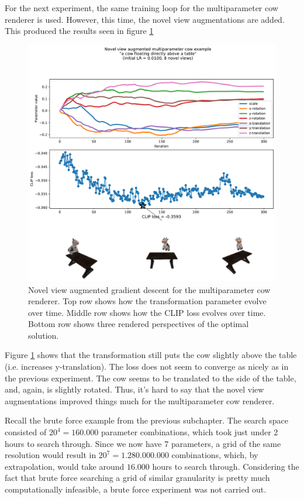 For the next experiment, the same training loop for the multiparameter cow renderer is used. However, this time, the novel view augmentations are added. This produced the results seen in figure \ref{fig:3_3-loss-graph-aug}

\begin{figure}[H]
    \centering
    \includegraphics[width=1.0\textwidth]{figures/3_3-loss-graph-aug.pdf}
    \caption{Novel view augmented gradient descent for the multiparameter cow renderer. Top row shows how the transformation parameter evolve over time. Middle row shows how the CLIP loss evolves over time. Bottom row shows three rendered perspectives of the optimal solution.}
    \label{fig:3_3-loss-graph-aug}
\end{figure}
Figure \ref{fig:3_3-loss-graph-aug} shows that the transformation still puts the cow slightly above the table (i.e. increases y-translation). The loss does not seem to converge as nicely as in the previous experiment. The cow seems to be translated to the side of the table, and, again, is slightly rotated. Thus, it's hard to say that the novel view augmentations improved things much for the multiparameter cow renderer.

Recall the brute force example from the previous subchapter. The search space consisted of $20^4 = 160.000$ parameter combinations, which took just under 2 hours to search through. Since we now have 7 parameters, a grid of the same resolution would result in $20^7 = 1.280.000.000$ combinations, which, by extrapolation, would take around $16.000$ hours to search through. Considering the fact that brute force searching a grid of similar granularity is pretty much computationally infeasible, a brute force experiment was not carried out.

